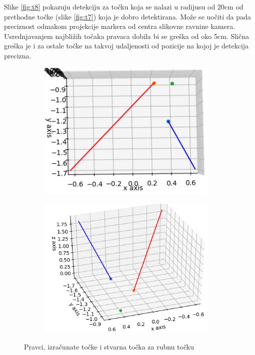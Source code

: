 \documentclass[times, utf8, diplomski]{fer}
\begin{document}
Slike \ref{fig:t8} pokazuju detekciju za točku koja se nalazi u radijusu od 20cm od prethodne točke (slike \ref{fig:t7}) koja je dobro detektirana. Može se uočiti da pada preciznost odmakom projekcije markera od centra slikovne ravnine kamera. Usrednjavanjem najbližih točaka pravaca dobila bi se greška od oko 5cm. Slična greška je i za ostale točke na takvoj udaljenosti od pozicije na kojoj je detekcija precizna.

\begin{figure}[h]
\begin{subfigure}[b]{.5\textwidth}
\centering
	\includegraphics[width=0.95\textwidth]{pravci_rub_1}
	\caption*{}
	\label{fig:rub_1}
\end{subfigure}
\begin{subfigure}[b]{.5\textwidth}
	\centering
	\includegraphics[width=0.95\textwidth]{pravci_rub_2}
	\caption*{}
	\label{fig:rub_2}
\end{subfigure}
\caption{Pravci, izračunate točke i stvarna točka za rubnu točku}
\label{fig:rub}
\end{figure}
\end{document}
